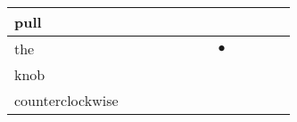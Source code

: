 \documentclass[landscape]{article}
\newcommand{\ssp}{\hspace{2pt}}
\newcommand{\mex}{\cellcolor{g}$\bullet$}
\begin{document}
\begin{tabular}{|l|p{10pt}|p{10pt}|p{10pt}|p{10pt}|p{10pt}|p{10pt}|p{10pt}|p{10pt}|p{10pt}|p{10pt}|p{10pt}|}
\hline
\ssp pull \ssp&\hspace{2pt}&\hspace{2pt}&\hspace{2pt}&\hspace{2pt}&\hspace{2pt}&\hspace{2pt}&\hspace{2pt}&\hspace{2pt}&\hspace{2pt}&\hspace{2pt}&\hspace{2pt}\\
\hline
\ssp \cellcolor{ref6}the \ssp&\hspace{2pt}&\hspace{2pt}&\hspace{2pt}&\hspace{2pt}&\hspace{2pt}&\hspace{2pt}&\hspace{2pt}\mex&\hspace{2pt}&\hspace{2pt}&\hspace{2pt}&\hspace{2pt}\\
\hline
\ssp knob \ssp&\hspace{2pt}&\hspace{2pt}&\hspace{2pt}&\hspace{2pt}&\hspace{2pt}&\hspace{2pt}&\hspace{2pt}&\hspace{2pt}&\hspace{2pt}&\hspace{2pt}&\hspace{2pt}\\
\hline
\ssp counterclockwise \ssp&\hspace{2pt}&\hspace{2pt}&\hspace{2pt}&\hspace{2pt}&\hspace{2pt}&\hspace{2pt}&\hspace{2pt}&\hspace{2pt}&\hspace{2pt}&\hspace{2pt}&\hspace{2pt}\\

\end{tabular}
\end{document}
